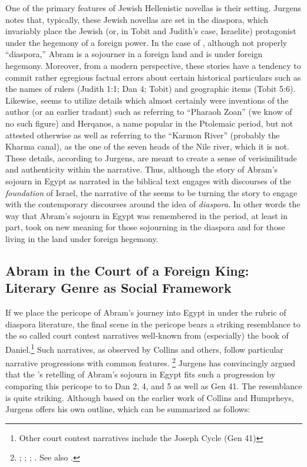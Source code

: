 One of the primary features of Jewish Hellenistic novellas is their setting. Jurgens notes that, typically, these Jewish novellas are set in the diaspora, which invariably place the Jewish (or, in Tobit and Judith's case, Israelite) protagonist under the hegemony of a foreign power. In the case of \ga, although not properly ``diaspora,'' Abram is a sojourner in a foreign land and is under foreign hegemony. Moreover, from a modern perspective, these stories have a tendency to commit rather egregious factual errors about certain historical particulars such as the names of rulers (Judith 1:1; Dan 4; Tobit) and geographic items (Tobit 5:6). Likewise, \ga seems to utilize details which almost certainly were inventions of the author (or an earlier tradant) such as referring to ``Pharaoh Zoan'' (we know of no such figure) and Herqanos, a name popular in the Ptolemaic period, but not attested otherwise as well as referring to the ``Karmon River'' (probably the Kharma canal), as the one of the seven heads of the Nile river, which it is not.\autocites[7]{jurgens_jsj2018}[See also][50--59]{machiela_as2010}[197--199]{fitzmyer2004} These details, according to Jurgens, are meant to create a sense of verisimilitude and authenticity within the narrative. Thus, although the story of Abram's sojourn in Egypt as narrated in the biblical text engages with discourses of the \emph{foundation} of Israel, the narrative of the \ga seems to be turning the story to engage with the contemporary discourses around the idea of \emph{diaspora}. In other words the way that Abram's sojourn in Egypt was remembered in the \secondtemple period, at least in part, took on new meaning for those sojourning in the diaspora and for those living in the land under foreign hegemony.

\subsection{Abram in the Court of a Foreign King: Literary Genre as Social Framework}

If we place the pericope of Abram's journey into Egypt in \ga under the rubric of diaspora literature, the final scene in the pericope bears a striking resemblance to the so called court contest narratives well-known from (especially) the book of Daniel.\footnote{Other court contest narratives include the Joseph Cycle (Gen 41)} Such narratives, as observed by Collins and others, follow particular narrative progressions with common features.%
%
\footnote{\cite[38--52]{collins1993}; \cite{humphreys_jbl1973}; \cite{collins_jbl1975}; \cite{wills1990}. See also \cite{niditch-doran_jbl1977}.}
%
Jurgens has convincingly argued that the \ga's retelling of Abram's sojourn in Egypt fits such a progression by comparing this pericope to to Dan 2, 4, and 5 as well as Gen 41. The resemblance is quite striking. Although based on the earlier work of Collins and Humprheys, Jurgens offers his own outline, which can be summarized as follows\autocite[21]{jurgens_jsj2018}:

